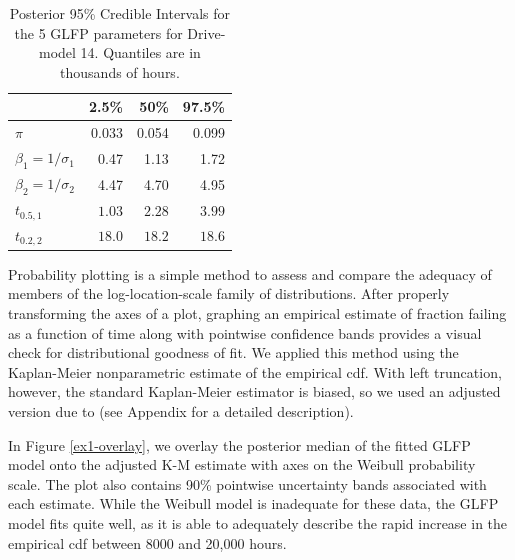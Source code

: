 \documentclass[12pt]{article}
\begin{document}
\begin{table}[H]
\centering
\begin{tabular}{lrrr}
  \hline
 & 2.5\% & 50\% & 97.5\% \\ 
  \hline
$\pi$ & 0.033 & 0.054 & 0.099 \\ 
 $\beta_1 = 1/\sigma_1 $ & 0.47 & 1.13 & 1.72 \\ 
  $\beta_2 = 1/\sigma_2$ & 4.47 & 4.70 & 4.95 \\ 
  $t_{0.5,1}$ & $1.03$  & $2.28$ & $3.99$\\ 
  $t_{0.2,2}$ & $18.0$ & $18.2$ & $18.6$ \\ 
   \hline
\end{tabular}
\caption{Posterior 95\% Credible Intervals for the 5 GLFP parameters for Drive-model 14.  Quantiles are in thousands of hours.}
\label{table:1}
\end{table}


Probability plotting is a simple method to assess and compare the adequacy of members of the log-location-scale family of distributions.  After properly transforming the axes of a plot, graphing an empirical estimate of fraction failing as a function of time along with pointwise confidence bands provides a visual check for distributional goodness of fit.  We applied this method using the Kaplan-Meier nonparametric estimate of the empirical cdf.  With left truncation, however, the standard Kaplan-Meier estimator is biased, so we used an adjusted version due to \citet[Chapter 11]{meeker} (see Appendix for a detailed description).   


In Figure \ref{ex1-overlay}, we overlay the posterior median of the fitted GLFP model onto the adjusted K-M estimate with axes on the Weibull probability scale.  The plot also contains 90\% pointwise uncertainty bands associated with each estimate. While the Weibull model is inadequate for these data, the GLFP model fits quite well, as it is able to adequately describe the rapid increase in the empirical cdf between 8000 and 20,000 hours. %
\end{document}
